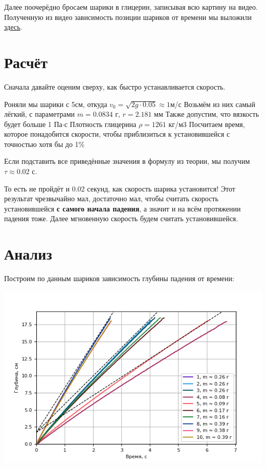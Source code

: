 \documentclass[a4paper, 12pt]{article}
\begin{document}
    Далее поочерёдно бросаем шарики в глицерин, записывая всю картину на видео.
    Полученную из видео зависимость позиции шариков от времени мы выложили
    \href{https://github.com/phys-labs-at-hse/glycerine/tree/master/particular_balls}{здесь}.


    \section{Расчёт}

    Сначала давайте оценим сверху, как быстро устанавливается скорость.

    Роняли мы шарики с 5см, откуда $v_0 = \sqrt{2g\cdot0.05} \approx 1$м/с
    Возьмём из них самый лёгкий, с параметрами $m = 0.0834$ г, $r = 2.181$ мм
    Также допустим, что вязкость будет больше 1 Па$\cdot$с
    Плотность глицерина $\rho = 1261$ кг/м3
    Посчитаем время, которое понадобится скорости, чтобы приблизиться к установившейся с точностью хотя бы до 1\%

    Если подставить все приведённые значения в формулу из теории, мы получим $\tau \approx 0.02$ с.

    То есть не пройдёт и 0.02 секунд, как скорость шарика установится!
    Этот результат чрезвычайно мал, достаточно мал,
    чтобы считать скорость установившейся \textbf{с самого начала падения}, а значит и на всём протяжении падения тоже.
    Далее мгновенную скорость будем считать установившейся.


    \section{Анализ}

    Построим по данным шариков зависимость глубины падения от времени:

    \includegraphics{position-time.png}
\end{document}
